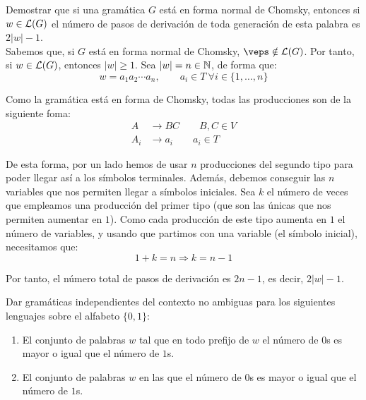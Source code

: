 \begin{ejercicio}\label{ej:1.4.19}
    Demostrar que si una gramática $G$ está en forma normal de Chomsky, entonces si $w \in \mathcal{L}(G)$ el número de pasos de derivación de toda generación de esta palabra es $2|w| - 1$.\\

    Sabemos que, si $G$ está en forma normal de Chomsky, $\veps\notin \cc{L}(G)$. Por tanto, si $w\in \mathcal{L}(G)$, entonces $|w|\geq 1$. Sea $|w|=n\in \mathbb{N}$, de forma que:
    \begin{equation*}
        w=a_1a_2\cdots a_n,\qquad a_i\in T~\forall i\in\{1,\ldots,n\}
    \end{equation*}

    Como la gramática está en forma de Chomsky, todas las producciones son de la siguiente foma:
    \begin{align*}
        A & \to BC\qquad B,C \in V\\
        A_i &\to a_i\qquad a_i\in T
    \end{align*}

    De esta forma, por un lado hemos de usar $n$ producciones del segundo tipo para poder llegar así a los símbolos terminales. Además, debemos conseguir las $n$ variables que nos permiten llegar a símbolos iniciales. Sea $k$ el número de veces que empleamos una producción del primer tipo (que son las únicas que nos  permiten aumentar en $1$). Como cada producción de este tipo aumenta en $1$ el número de variables, y usando que partimos con una variable (el símbolo inicial), necesitamos que:
    \begin{equation*}
        1+k=n\Longrightarrow k=n-1
    \end{equation*}

    Por tanto, el número total de pasos de derivación es $2n-1$, es decir, $2|w|-1$.
\end{ejercicio}

\begin{ejercicio}\label{ej:1.4.20}
    Dar gramáticas independientes del contexto no ambiguas para los siguientes lenguajes sobre el alfabeto $\{ 0, 1 \}$:
    \begin{enumerate}
        \item El conjunto de palabras $w$ tal que en todo prefijo de $w$ el número de $0$s es mayor o igual que el número de $1$s.
        \item El conjunto de palabras $w$ en las que el número de $0$s es mayor o igual que el número de $1$s.
    \end{enumerate}
\end{ejercicio}

